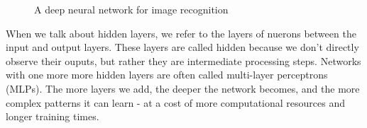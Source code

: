 \documentclass[9pt]{extarticle}
\theoremstyle{plain}
\theoremstyle{definition}
\theoremstyle{remark}
\begin{document}
\begin{figure}[h]
\begin{center}
    \end{center}
    \caption{A deep neural network for image recognition}
\end{figure}
When we talk about hidden layers, we refer to the layers of nuerons between the input and output layers. These layers are called hidden because we don't directly observe their ouputs, but rather they are intermediate processing steps. Networks with one more more hidden layers are often called multi-layer perceptrons (MLPs). The more layers we add, the deeper the network becomes, and the more complex patterns it can learn - at a cost of more computational resources and longer training times.

\pagebreak
\end{document}
